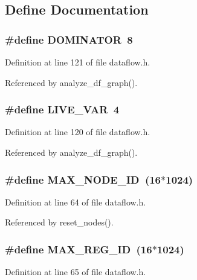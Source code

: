\subsection{Define Documentation}
\subsubsection{\setlength{\rightskip}{0pt plus 5cm}\#define DOMINATOR~8}\label{dataflow_8h_517f05be8c818bf691f0e729e5e6e9af}




Definition at line 121 of file dataflow.h.

Referenced by analyze\_\-df\_\-graph().
\subsubsection{\setlength{\rightskip}{0pt plus 5cm}\#define LIVE\_\-VAR~4}\label{dataflow_8h_e8794e51566af3a731689ce144b6fa3c}




Definition at line 120 of file dataflow.h.

Referenced by analyze\_\-df\_\-graph().
\subsubsection{\setlength{\rightskip}{0pt plus 5cm}\#define MAX\_\-NODE\_\-ID~(16$\ast$1024)}\label{dataflow_8h_a5c311e69c16b1745c4b6a79dabc5cd2}




Definition at line 64 of file dataflow.h.

Referenced by reset\_\-nodes().
\subsubsection{\setlength{\rightskip}{0pt plus 5cm}\#define MAX\_\-REG\_\-ID~(16$\ast$1024)}\label{dataflow_8h_623a421668b1e6ebadc81def2e184bf4}




Definition at line 65 of file dataflow.h.

